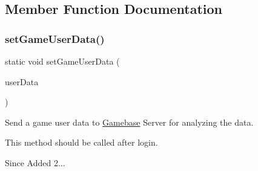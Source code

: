 \subsection{Member Function Documentation}
\mbox{\label{classcom_1_1toast_1_1android_1_1gamebase_1_1_gamebase_1_1_analytics_a2f339ad8d77890e3521e292bf84284ae}} 
\subsubsection{\texorpdfstring{set\+Game\+User\+Data()}{setGameUserData()}}
{\footnotesize\ttfamily static void set\+Game\+User\+Data (\begin{DoxyParamCaption}\item[{Game\+User\+Data}]{user\+Data }\end{DoxyParamCaption})\hspace{0.3cm}{\ttfamily [static]}}



Send a game user data to \hyperlink{classcom_1_1toast_1_1android_1_1gamebase_1_1_gamebase}{Gamebase} Server for analyzing the data. 

This method should be called after login.

\begin{DoxySince}{Since}
Added 2... 
\end{DoxySince}

